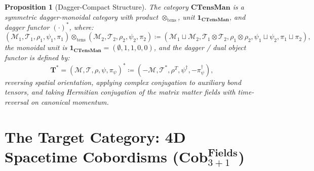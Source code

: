 \documentclass[11pt,a4paper,reqno]{amsart}
\newtheorem{proposition}[theorem]{Proposition}
\theoremstyle{definition}
\numberwithin{equation}{section}
\newcommand{\CTens}{\mathbf{CTensMan}}
\newcommand{\Cob}{\mathbf{Cob}_{3+1}^{\mathbf{Fields}}}
\begin{document}
\begin{proposition}[Dagger-Compact Structure] \label{prop:dagger}
The category $\CTens$ is a symmetric dagger-monoidal category with product $\otimes_{\mathrm{tens}}$, unit $\mathbf{1}_{\CTens}$, and dagger functor $(\cdot)^*$, where:
\begin{equation}
    (\mathcal{M}_1, \mathcal{T}_1, \rho_1, \psi_1, \pi_1) \otimes_{\mathrm{tens}} (\mathcal{M}_2, \mathcal{T}_2, \rho_2, \psi_2, \pi_2) \coloneqq (\mathcal{M}_1 \sqcup \mathcal{M}_2, \mathcal{T}_1 \otimes \mathcal{T}_2, \rho_1 \otimes \rho_2, \psi_1 \sqcup \psi_2, \pi_1 \sqcup \pi_2),
\end{equation}
the monoidal unit is $\mathbf{1}_{\CTens} = (\emptyset, 1, 1, 0, 0)$, and the dagger / dual object functor is defined by:
\begin{equation}
    \mathbf{T}^* = (\mathcal{M}, \mathcal{T}, \rho, \psi, \pi_\psi)^* \coloneqq (-\mathcal{M}, \mathcal{T}^*, \rho^T, \psi^\dagger, -\pi_\psi^\dagger),
\end{equation}
reversing spatial orientation, applying complex conjugation to auxiliary bond tensors, and taking Hermitian conjugation of the matrix matter fields with time-reversal on canonical momentum.
\end{proposition}

\section{The Target Category: 4D Spacetime Cobordisms (\texorpdfstring{$\Cob$}{Cob(3+1)})}
\label{sec:target_category}
\end{document}
